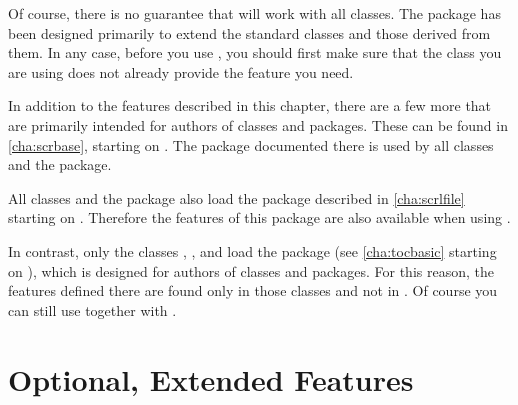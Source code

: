 Of course, there is no guarantee that  will work with all
classes. The package has been designed primarily to extend the standard
classes and those derived from them. In any case, before you use
, you should first make sure that the class you are using
does not already provide the feature you need.

In addition to the features described in this chapter, there are a few more
that are primarily intended for authors of classes and packages. These can be
found in \autoref{cha:scrbase}, starting on . The
\hyperref[cha:scrbase]{}%
package documented there is used by all \KOMAScript{} classes and the
 package.

All \KOMAScript{} classes and the  package also load the
\hyperref[cha:scrlfile]{}%
package described in \autoref{cha:scrlfile} starting on
. Therefore the features of this package are also
available when using .

\iftrue %
In contrast, only the \KOMAScript{} classes , ,
and  load the \hyperref[cha:tocbasic]{}
package (see \autoref{cha:tocbasic} starting on ),
which is designed for authors of classes and packages. For this reason, the
features defined there are found only in those classes and not in
. Of course you can still use
\hyperref[cha:tocbasic]{} together with
.%
\fi




\section{Optional, Extended Features}

